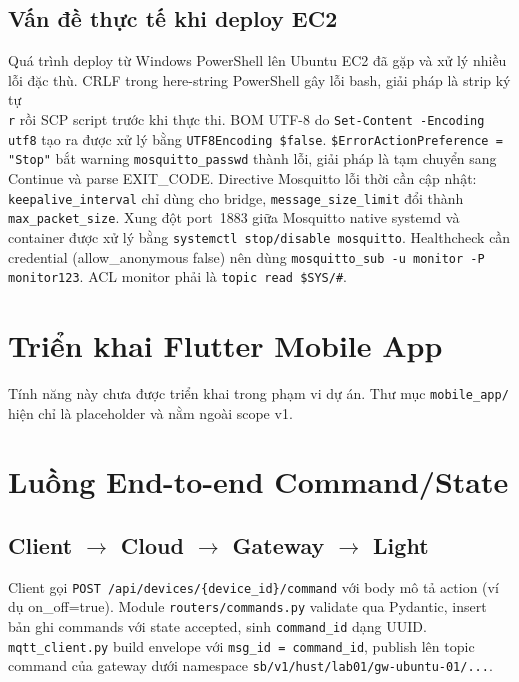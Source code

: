 \subsection{Vấn đề thực tế khi deploy EC2}
\label{sec:ch3-deploy-issues}

Quá trình deploy từ Windows PowerShell lên Ubuntu EC2 đã gặp và xử lý
nhiều lỗi đặc thù. CRLF trong here-string PowerShell gây lỗi bash,
giải pháp là strip ký tự \texttt{\\r} rồi SCP script trước khi thực
thi. BOM UTF-8 do \texttt{Set-Content -Encoding utf8} tạo ra được xử
lý bằng \texttt{UTF8Encoding \$false}.
\texttt{\$ErrorActionPreference = "Stop"} bắt warning
\texttt{mosquitto\_passwd} thành lỗi, giải pháp là tạm chuyển sang
Continue và parse EXIT\_CODE. Directive Mosquitto lỗi thời cần cập
nhật: \texttt{keepalive\_interval} chỉ dùng cho bridge,
\texttt{message\_size\_limit} đổi thành \texttt{max\_packet\_size}.
Xung đột port~1883 giữa Mosquitto native systemd và container được xử
lý bằng \texttt{systemctl stop/disable mosquitto}. Healthcheck cần
credential (allow\_anonymous false) nên dùng \texttt{mosquitto\_sub
-u monitor -P monitor123}. ACL monitor phải là
\texttt{topic read \$SYS/\#}.


\section{Triển khai Flutter Mobile App}
\label{sec:ch3-flutter}

Tính năng này chưa được triển khai trong phạm vi dự án. Thư mục
\texttt{mobile\_app/} hiện chỉ là placeholder và nằm ngoài scope v1.


\section{Luồng End-to-end Command/State}
\label{sec:ch3-e2e}

\subsection{Client $\rightarrow$ Cloud $\rightarrow$ Gateway
  $\rightarrow$ Light}
\label{sec:ch3-downlink-e2e}

Client gọi \texttt{POST /api/devices/\{device\_id\}/command} với body
mô tả action (ví dụ on\_off=true). Module \texttt{routers/commands.py}
validate qua Pydantic, insert bản ghi commands với state accepted,
sinh \texttt{command\_id} dạng UUID. \texttt{mqtt\_client.py} build
envelope với \texttt{msg\_id = command\_id}, publish lên topic command
của gateway dưới namespace
\texttt{sb/v1/hust/lab01/gw-ubuntu-01/...}.

